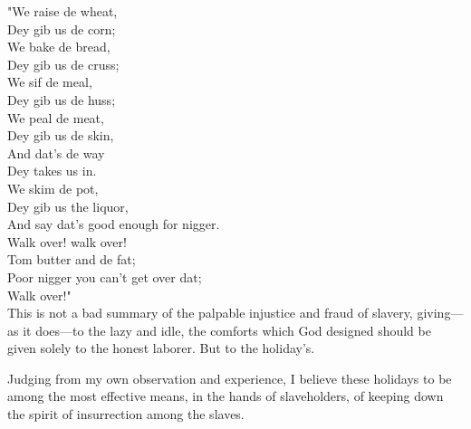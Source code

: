 {"}We raise de wheat,\\
Dey gib us de corn;\\
We bake de bread,\\
Dey gib us de cruss;\\
We sif de meal,\\
Dey gib us de huss;\\
{\protect\hypertarget{253}{}{}}We peal de meat,\\
Dey gib us de skin,\\
And dat's de way\\
Dey takes us in.\\
We skim de pot,\\
Dey gib us the liquor,\\
And say dat's good enough for nigger.\\
{﻿}Walk over! walk over!\\
{﻿}Tom butter and de fat;\\
{﻿}Poor nigger you can't get over dat;\\
{﻿}Walk over!"\\

This is not a bad summary of the palpable injustice and fraud of
slavery, giving---as it does---to the lazy and idle, the comforts which
God designed should be given solely to the honest laborer. But to the
holiday's.

Judging from my own observation and experience, I believe these holidays
to be among the most effective means, in the hands of slaveholders, of
keeping down the spirit of insurrection among the slaves.

